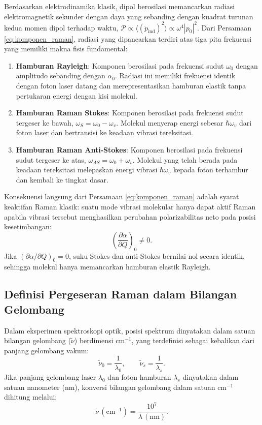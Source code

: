 Berdasarkan elektrodinamika klasik, dipol berosilasi memancarkan radiasi elektromagnetik sekunder dengan daya yang sebanding dengan kuadrat turunan kedua momen dipol terhadap waktu, $\mathcal{P} \propto \langle (\ddot{p}_{\mathrm{ind}})^2 \rangle \propto \omega^4 |p_0|^2$. Dari Persamaan \eqref{eq:komponen_raman}, radiasi yang dipancarkan terdiri atas tiga pita frekuensi yang memiliki makna fisis fundamental:
\begin{enumerate}
    \item \textbf{Hamburan Rayleigh}: Komponen berosilasi pada frekuensi sudut $\omega_0$ dengan amplitudo sebanding dengan $\alpha_0$. Radiasi ini memiliki frekuensi identik dengan foton laser datang dan merepresentasikan hamburan elastik tanpa pertukaran energi dengan kisi molekul.
    \item \textbf{Hamburan Raman Stokes}: Komponen berosilasi pada frekuensi sudut tergeser ke bawah, $\omega_S = \omega_0 - \omega_v$. Molekul menyerap energi sebesar $\hbar\omega_v$ dari foton laser dan bertransisi ke keadaan vibrasi tereksitasi.
    \item \textbf{Hamburan Raman Anti-Stokes}: Komponen berosilasi pada frekuensi sudut tergeser ke atas, $\omega_{AS} = \omega_0 + \omega_v$. Molekul yang telah berada pada keadaan tereksitasi melepaskan energi vibrasi $\hbar\omega_v$ kepada foton terhambur dan kembali ke tingkat dasar.
\end{enumerate}

Konsekuensi langsung dari Persamaan \eqref{eq:komponen_raman} adalah syarat keaktifan Raman klasik: suatu mode vibrasi molekular hanya dapat aktif Raman apabila vibrasi tersebut menghasilkan perubahan polarizabilitas neto pada posisi kesetimbangan:
\begin{equation}
\left(\frac{\partial \alpha}{\partial Q}\right)_0 \neq 0.
\label{eq:syarat_keaktifan_raman}
\end{equation}
Jika $(\partial \alpha/\partial Q)_0 = 0$, suku Stokes dan anti-Stokes bernilai nol secara identik, sehingga molekul hanya memancarkan hamburan elastik Rayleigh.

\subsection{Definisi Pergeseran Raman dalam Bilangan Gelombang}
Dalam eksperimen spektroskopi optik, posisi spektrum dinyatakan dalam satuan bilangan gelombang ($\tilde{\nu}$) berdimensi $\text{cm}^{-1}$, yang terdefinisi sebagai kebalikan dari panjang gelombang vakum:
\begin{equation}
\tilde{\nu}_0 = \frac{1}{\lambda_0}, \qquad \tilde{\nu}_s = \frac{1}{\lambda_s}.
\label{eq:bilangan_gelombang}
\end{equation}
Jika panjang gelombang laser $\lambda_0$ dan foton hamburan $\lambda_s$ dinyatakan dalam satuan nanometer ($\text{nm}$), konversi bilangan gelombang dalam satuan $\text{cm}^{-1}$ dihitung melalui:
\begin{equation}
\tilde{\nu} \, (\text{cm}^{-1}) = \frac{10^7}{\lambda \, (\text{nm})}.
\end{equation}

